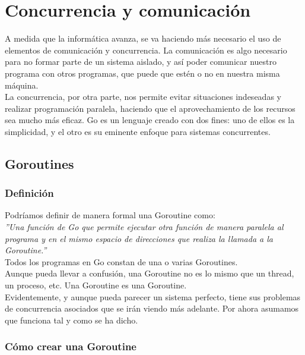 
\chapter{Concurrencia y comunicación}

A medida que la informática avanza, se va haciendo más necesario el uso de
elementos de comunicación y concurrencia. La comunicación es algo necesario para
no formar parte de un sistema aislado, y así poder comunicar nuestro programa
con otros programas, que puede que estén o no en nuestra misma máquina.\\

La concurrencia, por otra parte, nos permite evitar situaciones indeseadas
y realizar programación paralela, haciendo que el aprovechamiento de los
recursos sea mucho más eficaz. Go es un lenguaje creado con dos fines: uno de
ellos es la simplicidad, y el otro es su eminente enfoque para sistemas
concurrentes.

\section{Goroutines}

	\subsection{Definición}
	
	Podríamos definir de manera formal una Goroutine como: \\

	\textit{''Una función de Go que permite ejecutar otra función de manera
	paralela al programa y en el mismo espacio de direcciones que realiza la
	llamada a la Goroutine.''}\\

	Todos los programas en Go constan de una o varias Goroutines.\\

	Aunque pueda llevar a confusión, una Goroutine no es lo mismo que un thread,
	un proceso, etc. Una Goroutine es una Goroutine.\\

	Evidentemente, y aunque pueda parecer un sistema perfecto, tiene sus
	problemas de concurrencia asociados que se irán viendo más adelante. Por
	ahora asumamos que funciona tal y como se ha dicho.  \clearpage
	\subsection{Cómo crear una Goroutine}
	
